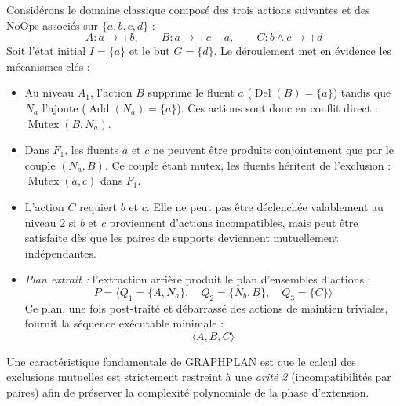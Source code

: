 \begin{example}    
    Considérons le domaine classique composé des trois actions suivantes et des NoOps associés sur $\{a, b, c, d\}$ :
    \begin{equation*}
        A : a \longrightarrow +b, \qquad B : a \longrightarrow +c -a, \qquad C : b \land c \longrightarrow +d
    \end{equation*}
    Soit l'état initial $I = \{a\}$ et le but $G = \{d\}$. Le déroulement met en évidence les mécanismes clés :
    \begin{itemize}
        \item Au niveau $A_1$, l'action $B$ supprime le fluent $a$ ($\operatorname{Del}(B) = \{a\}$) tandis que $N_a$ l'ajoute ($\operatorname{Add}(N_a) = \{a\}$). Ces actions sont donc en conflit direct : $\operatorname{Mutex}(B, N_a)$.
        
        \item Dans $F_1$, les fluents $a$ et $c$ ne peuvent être produits conjointement que par le couple $(N_a, B)$. Ce couple étant mutex, les fluents héritent de l'exclusion : $\operatorname{Mutex}(a, c)$ dans $F_1$.
        
        \item L'action $C$ requiert $b$ et $c$. Elle ne peut pas être déclenchée valablement au niveau 2 si $b$ et $c$ proviennent d'actions incompatibles, mais peut être satisfaite dès que les paires de supports deviennent mutuellement indépendantes.
        
        \item \emph{Plan extrait :} l'extraction arrière produit le plan d'ensembles d'actions :
        \begin{equation}
            P = \big\langle Q_1 = \{A, N_a\}, \quad Q_2 = \{N_b, B\}, \quad Q_3 = \{C\} \big\rangle
        \end{equation}
        Ce plan, une fois post-traité et débarrassé des actions de maintien triviales, fournit la séquence exécutable minimale :
        \begin{equation}
            \langle A, B, C \rangle
        \end{equation}
    \end{itemize}

    
\end{example}

Une caractéristique fondamentale de GRAPHPLAN est que le calcul des exclusions mutuelles est strictement restreint à une \emph{arité 2} (incompatibilités par paires) afin de préserver la complexité polynomiale de la phase d'extension.

